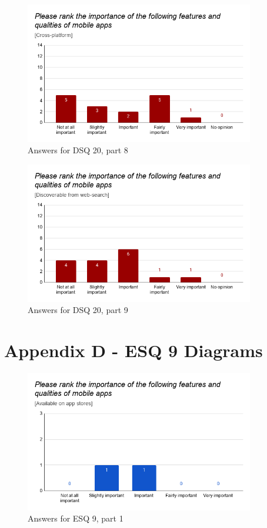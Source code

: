 \documentclass[a4paper,12pt]{article}
\begin{document}
\begin{figure}[ht!]
    \centering
    \includegraphics[width=10cm]{img/Results/dsq20_8.png}
    \caption{Answers for DSQ 20, part 8}
    \label{fig:res_devq20_8}
\end{figure}

\begin{figure}[ht!]
    \centering
    \includegraphics[width=10cm]{img/Results/dsq20_9.png}
    \caption{Answers for DSQ 20, part 9}
    \label{fig:res_devq20_9}
\end{figure}

\newpage

\section{Appendix D - ESQ 9 Diagrams}
\label{Appendix_eduMultiDiagrams}

\begin{figure}[ht!]
    \centering
    \includegraphics[width=10cm]{img/Results/esq9_1.png}
    \caption{Answers for ESQ 9, part 1}
    \label{fig:res_eduq9_1}
\end{figure}
\end{document}
